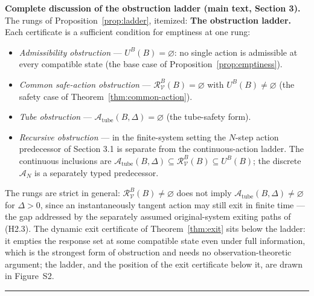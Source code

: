 \documentclass[11pt]{article}
\theoremstyle{definition}
\begin{document}
\bigskip
\noindent\textbf{Complete discussion of the obstruction ladder (main text, Section 3).}
The rungs of Proposition~\ref{prop:ladder}, itemized:
\textbf{The obstruction ladder.} Each certificate is a sufficient
condition for emptiness at one rung:
\begin{itemize}
\item \emph{Admissibility obstruction} --- \(U^B(B)=\varnothing\): no
single action is admissible at every compatible state (the base case of
Proposition~\ref{prop:emptiness}).
\item \emph{Common safe-action obstruction} ---
\(\mathcal{R}_{\mathcal{V}}^B(B)=\varnothing\) with
\(U^B(B)\neq\varnothing\) (the safety case of
Theorem~\ref{thm:common-action}).
\item \emph{Tube obstruction} ---
\(\mathcal{A}_{\mathrm{tube}}(B,\Delta)=\varnothing\) (the tube-safety
form).
\item \emph{Recursive obstruction} --- in the finite-system setting the \(N\)-step action predecessor of Section 3.1 is separate from the continuous-action ladder. The continuous inclusions are
\(\mathcal{A}_{\mathrm{tube}}(B,\Delta)\subseteq\mathcal{R}_{\mathcal{V}}^B(B)\subseteq U^B(B)\); the discrete \(\mathcal A_N\) is a separately typed predecessor.
\end{itemize}
The rungs are strict in general: \(\mathcal{R}_{\mathcal{V}}^B(B)\neq\varnothing\)
does not imply \(\mathcal{A}_{\mathrm{tube}}(B,\Delta)\neq\varnothing\)
for \(\Delta>0\), since an instantaneously tangent action may still exit
in finite time --- the gap addressed by the separately assumed original-system exiting paths of (H2.3). The dynamic exit certificate of
Theorem~\ref{thm:exit} sits below the ladder: it empties the response
set at some compatible state even under full information, which is the
strongest form of obstruction and needs no observation-theoretic
argument; the ladder, and the position of the exit certificate below it, are drawn in Figure~S2.
\rule{0.5\linewidth}{0.5pt}
\end{document}
